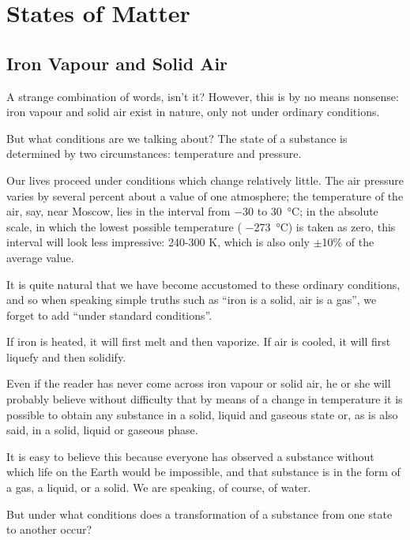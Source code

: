 

\cleardoublepage
\chapter{States of Matter}
\label{ch-04}


\section{Iron Vapour and Solid Air}

A strange combination of words, isn’t it? However, this is by no means nonsense: iron vapour and solid air exist in nature, only not under ordinary conditions.

But what conditions are we talking about? The state of a substance is determined by two circumstances: tem­perature and pressure.

Our lives proceed under conditions which change rela­tively little. The air pressure varies by several percent about a value of one atmosphere; the temperature of the air, say, near Moscow, lies in the interval from $-30$ to \SI{+30}{\celsius}; in the absolute scale, in which the lowest pos­sible temperature ( \SI{-273}{\celsius}) is taken as zero, this interval will look less impressive: 240-300 \si{\kelvin}, which is also only $\pm$10\% of the average value.

It is quite natural that we have become accustomed to these ordinary conditions, and so when speaking simple truths such as ``iron is a solid, air is a gas'', we forget to add ``under standard conditions''.

If iron is heated, it will first melt and then vaporize. If air is cooled, it will first liquefy and then solidify.

Even if the reader has never come across iron vapour or solid air, he or she will probably believe without difficulty that by means of a change in temperature it is possible to obtain any substance in a solid, liquid and gaseous state or, as is also said, in a solid, liquid or gaseous phase.

It is easy to believe this because everyone has observed a substance without which life on the Earth would be impossible, and that substance is in the form of a gas, a liquid, or a solid. We are speaking, of course, of water.

But under what conditions does a transformation of a substance from one state to another occur?

